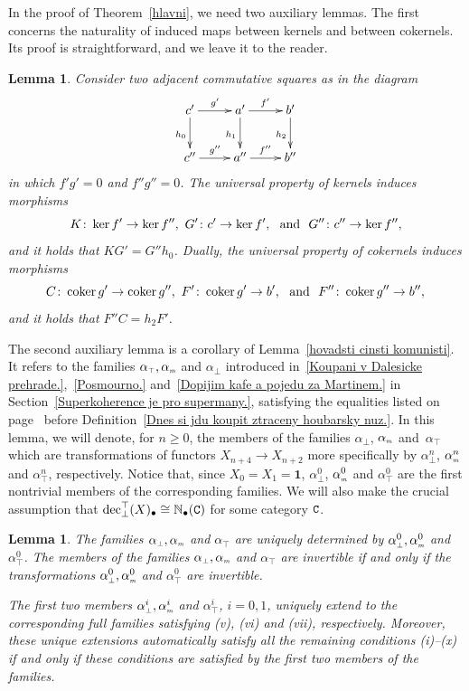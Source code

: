 \documentclass[12pt,leqno]{amsart}
\newtheorem{lemma}[theorem]{Lemma}
\theoremstyle{definition}
\def\uldec{{\rm dec}_{\bot}^{\top}}
\def\atop{\alpha_{\scriptscriptstyle\top}}
\def\abot{\alpha_{\scriptscriptstyle\bot}}
\def\amix{\alpha_{\scriptscriptstyle{\it{m}}}}
\newcommand{\C}{{\tt C}}
\newcommand{\NN}{\mathbb{N}}
\newcommand{\4}{\texttt{4}}
\newcommand{\jed}{\mathbf{1}}
\DeclareMathOperator{\coker}{coker}
\begin{document}
In the proof of Theorem~\ref{hlavni}, we need two auxiliary
lemmas. The first concerns  
the naturality of induced maps between kernels and
between cokernels. Its proof is straightforward, and we leave it  to the reader. 
\begin{lemma}
\label{spani v kancelari v Praze}
Consider two adjacent commutative squares as in the diagram
\[
\xymatrix{c'\ar[r]^{g'} \ar[d]_{h_0}  &  \ar[d]_{h_1}  a'\ar[r]^{f'} 
&  \ar[d]_{h_2}  b'
\\
c'' \ar[r]^{g''} & a''\ar[r]^{f''} & b''
}
\]
in which $f'g'=0$ and $f''g''=0$. The universal property of kernels induces
morphisms
\[
K\colon\ker f' \to \ker f'',\ G'\colon c'\to \ker f', \ \hbox { and } \
G''\colon c''\to \ker f'',
\]
and it holds that $KG'=G''h_0$.
Dually, the universal property of cokernels induces morphisms 
\[
C\colon\coker g' \to \coker g'',\ F'\colon \coker g'\to b', \
\hbox { and } \ F''\colon \coker g''\to b'',
\]
and it holds that $F''C=h_2F'$.
\end{lemma}


The second auxiliary lemma is a corollary of Lemma~\ref{hovadsti
  cinsti komunisti}. It refers to the families $\atop, \amix$ and
$\abot$ introduced in~\eqref{Koupani v Dalesicke
  prehrade.},~\eqref{Posmourno.} and~\eqref{Dopijim kafe a pojedu za
  Martinem.} in Section~\ref{Superkoherence je pro supermany.},
satisfying the equalities listed on page~\pageref{10 coherence
  conditions} before Definition~\ref{Dnes si jdu koupit ztraceny
  houbarsky nuz.}.  In this lemma, we will denote, for $n \geq 0$, 
the members of the
families $\abot$, $\amix$ and~$\atop$ which are transformations of
functors $X_{n+4} \to X_{n+2}$ more specifically by $\abot^n$,
$\amix^n$ and $\atop^n$, respectively. Notice that, since $X_0=X_1=\jed$, 
$\abot^0$, $\amix^0$ and $\atop^0$ are the first nontrivial members of
the corresponding families. We will also make the crucial assumption
that $\uldec( X)_\bullet \cong \NN_\bullet(\C)$ for some category
$\C$.

\begin{lemma}
\label{Asi po 10 letech mam chripku!}
The families $\abot, \amix$ and $\atop$ are uniquely
determined by $\abot^0, \amix^0$ and $\atop^0$. The members of the
families  $\abot, \amix$ and $\atop$ are invertible if and only if 
the transformations  $\abot^0, \amix^0$ and $\atop^0$ are invertible.

The first two members $\abot^i, \amix^i$ and $\atop^i$, $i=0,1$, 
uniquely extend to the corresponding full families satisfying (v),
(vi) and (vii), respectively.
Moreover, these unique extensions
automatically satisfy all the remaining conditions (i)--(x) if and
only if these conditions are satisfied by the first two  members of 
the families. 
\end{lemma}
\end{document}

